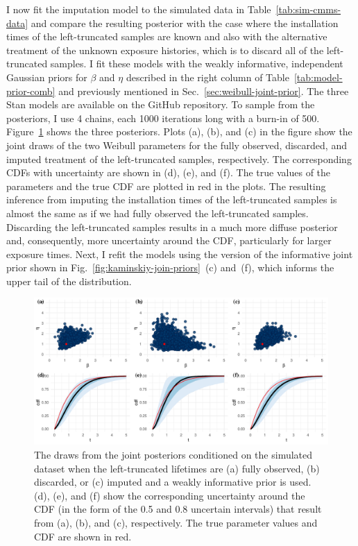 I now fit the imputation model to the simulated data in Table~\ref{tab:sim-cmms-data} and compare the resulting posterior with the case where the installation times of the left-truncated samples are known and also with the alternative treatment of the unknown exposure histories, which is to discard all of the left-truncated samples. I fit these models with the weakly informative, independent Gaussian priors for $\beta$ and $\eta$ described in the right column of Table~\ref{tab:model-prior-comb} and previously mentioned in Sec.~\ref{sec:weibull-joint-prior}. The three Stan models are available on the GitHub repository. To sample from the posteriors, I use 4 chains, each 1000 iterations long with a burn-in of 500. Figure~\ref{fig:joint-post-weibull} shows the three posteriors. Plots (a), (b), and (c) in the figure show the joint draws of the two Weibull parameters for the fully observed, discarded, and imputed treatment of the left-truncated samples, respectively. The corresponding CDFs with uncertainty are shown in (d), (e), and (f). The true values of the parameters and the true CDF are plotted in red in the plots. The resulting inference from imputing the installation times of the left-truncated samples is almost the same as if we had fully observed the left-truncated samples. Discarding the left-truncated samples results in a much more diffuse posterior and, consequently, more uncertainty around the CDF, particularly for larger exposure times. Next, I refit the models using the version of the informative joint prior shown in Fig.~\ref{fig:kaminskiy-join-priors}~(c) and~(f), which informs the upper tail of the distribution.

\begin{figure}[t]
    \centering
    \includegraphics[width=1\textwidth]{./figures/ch-2/joint-posts.pdf}
    \caption{The draws from the joint posteriors conditioned on the simulated dataset when the left-truncated lifetimes are (a) fully observed, (b) discarded, or (c) imputed and a weakly informative prior is used. (d), (e), and (f) show the corresponding uncertainty around the CDF (in the form of the 0.5 and 0.8 uncertain intervals) that result from (a), (b), and (c), respectively. The true parameter values and CDF are shown in red.}
    \label{fig:joint-post-weibull}
\end{figure}

